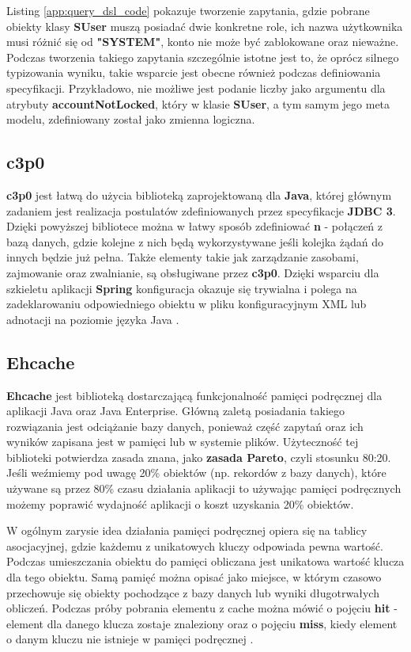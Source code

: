 	Listing \ref{app:query_dsl_code} pokazuje tworzenie zapytania, gdzie pobrane obiekty klasy \textbf{SUser} muszą posiadać dwie konkretne role, ich nazwa użytkownika musi różnić się od \textbf{"SYSTEM"}, konto nie może być zablokowane oraz nieważne. Podczas tworzenia takiego zapytania szczególnie istotne jest to, że oprócz silnego typizowania wyniku, takie wsparcie jest obecne również podczas definiowania specyfikacji. Przykładowo, nie możliwe jest podanie liczby jako argumentu dla atrybuty \textbf{accountNotLocked}, który w klasie \textbf{SUser}, a tym samym jego meta modelu, zdefiniowany został jako zmienna logiczna. 

\subsection{c3p0}
\label{tech:c3p0}
	\textbf{c3p0} jest łatwą do użycia biblioteką zaprojektowaną dla \textbf{Java}, której głównym zadaniem jest realizacja postulatów zdefiniowanych przez specyfikacje \textbf{JDBC 3}. Dzięki powyższej bibliotece można w łatwy sposób zdefiniować \textbf{n} - połączeń z bazą danych, gdzie kolejne z nich będą wykorzystywane jeśli kolejka żądań do innych będzie już pełna. Także elementy takie jak zarządzanie zasobami, zajmowanie oraz zwalnianie, są obsługiwane przez \textbf{c3p0}. Dzięki wsparciu dla szkieletu aplikacji \textbf{Spring} konfiguracja okazuje się trywialna i polega na zadeklarowaniu odpowiedniego obiektu w pliku konfiguracyjnym XML lub adnotacji na poziomie języka Java \cite{c3p0}.
	
\subsection{Ehcache}
	\textbf{Ehcache} jest biblioteką dostarczającą funkcjonalność pamięci podręcznej dla aplikacji Java oraz Java Enterprise. Główną zaletą posiadania takiego rozwiązania jest odciążanie bazy danych, ponieważ część zapytań oraz ich wyników zapisana jest w pamięci lub w systemie plików. Użyteczność tej biblioteki potwierdza zasada znana, jako \textbf{zasada Pareto}, czyli stosunku 80:20. Jeśli weźmiemy pod uwagę 20\% obiektów (np. rekordów z bazy danych), które używane są przez 80\% czasu działania aplikacji to używając pamięci podręcznych możemy poprawić wydajność aplikacji o koszt uzyskania 20\% obiektów.
	
	W ogólnym zarysie idea działania pamięci podręcznej opiera się na tablicy asocjacyjnej, gdzie każdemu z unikatowych kluczy odpowiada pewna wartość. Podczas umieszczania obiektu do pamięci obliczana jest unikatowa wartość klucza dla tego obiektu. Samą pamięć można opisać jako miejsce, w którym czasowo przechowuje się obiekty pochodzące z bazy danych lub wyniki długotrwałych obliczeń. Podczas próby pobrania elementu z cache można mówić o pojęciu \textbf{hit} - element dla danego klucza zostaje znaleziony oraz o pojęciu \textbf{miss}, kiedy element o danym kluczu nie istnieje w pamięci podręcznej \cite{ehcache_documentation_ref}.
		
